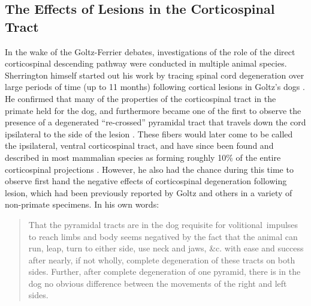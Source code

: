 \subsection{The Effects of Lesions in the Corticospinal Tract}

In the wake of the Goltz-Ferrier debates, investigations of the role of the direct corticospinal descending pathway were conducted in multiple animal species. Sherrington himself started out his work by tracing spinal cord degeneration over large periods of time (up to 11 months) following cortical lesions in Goltz's dogs \cite{Langley1884,Sherrington1885}. He confirmed that many of the properties of the corticospinal tract in the primate held for the dog, and furthermore became one of the first to observe the presence of a degenerated ``re-crossed'' pyramidal tract that travels down the cord ipsilateral to the side of the lesion \cite{Sherrington1885}. These fibers would later come to be called the ipsilateral, ventral corticospinal tract, and have since been found and described in most mammalian species as forming roughly 10\% of the entire corticospinal projections \cite{Kuypers1981,Brosamle2000,Lacroix2004}. However, he also had the chance during this time to observe first hand the negative effects of corticospinal degeneration following lesion, which had been previously reported by Goltz and others in a variety of non-primate specimens. In his own words:

\blockquote[{\protect\cite[p.189]{Sherrington1885}}]{That the pyramidal tracts are in the dog requisite for volitional~impulses to reach limbs and body seems negatived by the fact that the animal can run, leap, turn to either side, use neck and jaws, \&c. with ease and success after nearly, if not wholly, complete degeneration of these tracts on both sides. Further, after complete degeneration of one pyramid, there is in the dog no obvious difference between the movements of the right and left sides.}

